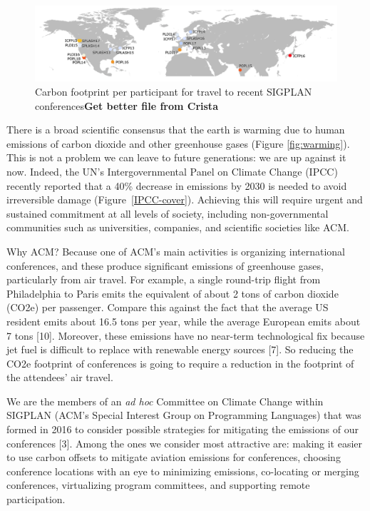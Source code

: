 \documentclass[12pt]{article}
\newcommand{\bcp}[1]{{\bf #1}}
\begin{document}
\begin{figure}[tb]
\centering
\includegraphics[width=6in]{SIGPLAN-confs.png}
\caption{Carbon footprint per participant for travel to recent SIGPLAN
  conferences\bcp{Get better file from Crista}} 
\label{fig:confs}
\end{figure}

There is a broad scientific consensus that the earth is warming due to human
emissions of carbon dioxide and other greenhouse gases (Figure
\ref{fig:warming}). This is not a problem we can leave to future
generations: we are up against it now. Indeed, the UN’s Intergovernmental
Panel on Climate Change (IPCC) recently reported that a 40\% decrease in
emissions by 2030 is needed to avoid irreversible damage
(Figure~\ref{IPCC-cover}). Achieving this will require urgent and sustained
commitment at all levels of society, including non-governmental communities
such as universities, companies, and scientific societies like ACM.

Why ACM? Because one of ACM’s main activities is organizing international
conferences, and these produce significant emissions of greenhouse gases,
particularly from air travel. For example, a single round-trip flight from
Philadelphia to Paris emits the equivalent of about 2 tons of carbon dioxide
(CO2e) per passenger. Compare this against the fact that the average US
resident emits about 16.5 tons per year, while the average European emits
about 7 tons [10].  Moreover, these emissions have no near-term
technological fix because jet fuel is difficult to replace with renewable
energy sources [7]. So reducing the CO2e footprint of conferences is going
to require a reduction in the footprint of the attendees’ air travel.

We are the members of an {\em ad hoc} Committee on Climate Change within
SIGPLAN (ACM’s Special Interest Group on Programming Languages) that was
formed in 2016 to consider possible strategies for mitigating the emissions
of our conferences [3]. Among the ones we consider most attractive are:
making it easier to use carbon offsets to mitigate aviation emissions for
conferences, choosing conference locations with an eye to minimizing
emissions, co-locating or merging conferences, virtualizing program
committees, and supporting remote participation.
\end{document}
